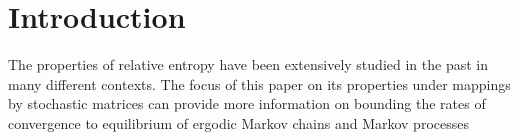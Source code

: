 \section{Introduction}
The properties of relative entropy have been extensively studied in the past in many different contexts. The focus of this paper on its properties under mappings by stochastic matrices can provide more information on bounding the rates of convergence to equilibrium of ergodic Markov chains and Markov processes 
